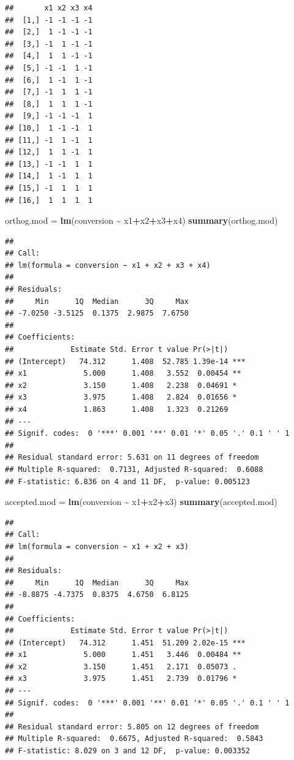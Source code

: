 \documentclass[
]{article}
\newenvironment{Shaded}{\begin{snugshade}}{\end{snugshade}}
\newcommand{\FunctionTok}[1]{\textcolor[rgb]{0.13,0.29,0.53}{\textbf{#1}}}
\newcommand{\NormalTok}[1]{#1}
\newcommand{\OtherTok}[1]{\textcolor[rgb]{0.56,0.35,0.01}{#1}}
\newcommand{\SpecialCharTok}[1]{\textcolor[rgb]{0.81,0.36,0.00}{\textbf{#1}}}
\begin{document}
\begin{verbatim}
##       x1 x2 x3 x4
##  [1,] -1 -1 -1 -1
##  [2,]  1 -1 -1 -1
##  [3,] -1  1 -1 -1
##  [4,]  1  1 -1 -1
##  [5,] -1 -1  1 -1
##  [6,]  1 -1  1 -1
##  [7,] -1  1  1 -1
##  [8,]  1  1  1 -1
##  [9,] -1 -1 -1  1
## [10,]  1 -1 -1  1
## [11,] -1  1 -1  1
## [12,]  1  1 -1  1
## [13,] -1 -1  1  1
## [14,]  1 -1  1  1
## [15,] -1  1  1  1
## [16,]  1  1  1  1
\end{verbatim}

\begin{Shaded}
\begin{Highlighting}[]
\NormalTok{orthog.mod }\OtherTok{=} \FunctionTok{lm}\NormalTok{(conversion }\SpecialCharTok{\textasciitilde{}}\NormalTok{ x1}\SpecialCharTok{+}\NormalTok{x2}\SpecialCharTok{+}\NormalTok{x3}\SpecialCharTok{+}\NormalTok{x4)}
\FunctionTok{summary}\NormalTok{(orthog.mod)}
\end{Highlighting}
\end{Shaded}

\begin{verbatim}
## 
## Call:
## lm(formula = conversion ~ x1 + x2 + x3 + x4)
## 
## Residuals:
##     Min      1Q  Median      3Q     Max 
## -7.0250 -3.5125  0.1375  2.9875  7.6750 
## 
## Coefficients:
##             Estimate Std. Error t value Pr(>|t|)    
## (Intercept)   74.312      1.408  52.785 1.39e-14 ***
## x1             5.000      1.408   3.552  0.00454 ** 
## x2             3.150      1.408   2.238  0.04691 *  
## x3             3.975      1.408   2.824  0.01656 *  
## x4             1.863      1.408   1.323  0.21269    
## ---
## Signif. codes:  0 '***' 0.001 '**' 0.01 '*' 0.05 '.' 0.1 ' ' 1
## 
## Residual standard error: 5.631 on 11 degrees of freedom
## Multiple R-squared:  0.7131, Adjusted R-squared:  0.6088 
## F-statistic: 6.836 on 4 and 11 DF,  p-value: 0.005123
\end{verbatim}

\begin{Shaded}
\begin{Highlighting}[]
\NormalTok{accepted.mod }\OtherTok{=} \FunctionTok{lm}\NormalTok{(conversion }\SpecialCharTok{\textasciitilde{}}\NormalTok{ x1}\SpecialCharTok{+}\NormalTok{x2}\SpecialCharTok{+}\NormalTok{x3)}
\FunctionTok{summary}\NormalTok{(accepted.mod)}
\end{Highlighting}
\end{Shaded}

\begin{verbatim}
## 
## Call:
## lm(formula = conversion ~ x1 + x2 + x3)
## 
## Residuals:
##     Min      1Q  Median      3Q     Max 
## -8.8875 -4.7375  0.8375  4.6750  6.8125 
## 
## Coefficients:
##             Estimate Std. Error t value Pr(>|t|)    
## (Intercept)   74.312      1.451  51.209 2.02e-15 ***
## x1             5.000      1.451   3.446  0.00484 ** 
## x2             3.150      1.451   2.171  0.05073 .  
## x3             3.975      1.451   2.739  0.01796 *  
## ---
## Signif. codes:  0 '***' 0.001 '**' 0.01 '*' 0.05 '.' 0.1 ' ' 1
## 
## Residual standard error: 5.805 on 12 degrees of freedom
## Multiple R-squared:  0.6675, Adjusted R-squared:  0.5843 
## F-statistic: 8.029 on 3 and 12 DF,  p-value: 0.003352
\end{verbatim}
\end{document}
